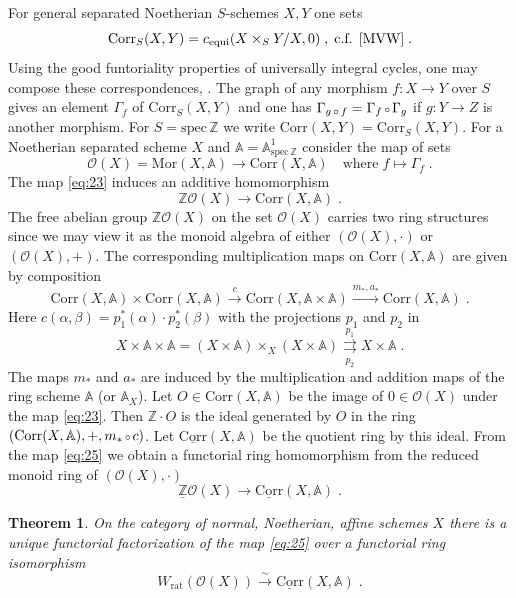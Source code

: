 \documentclass[12pt,leqno]{article}
\newcommand{\A}{{\mathbb{A}}}
\newcommand{\Z}{{\mathbb{Z}}}
\newcommand{\uZ}{\underline{\Z}}
\newcommand{\Corr}{\mathrm{Corr}}
\newcommand{\uCorr}{\underline{\Corr}}
\newcommand{\equi}{\mathrm{equi}}
\newcommand{\Mor}{\mathrm{Mor}}
\newcommand{\spec}{\mathrm{spec}\,}
\newcommand{\rat}{\mathrm{rat}}
\newcommand{\Oh}{{\mathcal O}}
\newcommand{\silo}{\stackrel{\sim}{\rightarrow}}
\newtheorem{theorem}{Theorem}[section]
\newcommand{\verk}{\mbox{\scriptsize $\,\circ\,$}}
\begin{document}
For general separated Noetherian $S$-schemes $X , Y$ one sets
\[
\Corr_S (X,Y) = c_{\equi} (X \times_S Y / X ,0) \; , \; \text{c.f. \cite[Definition 1A.9]{MVW}} \; .
\]
Using the good funtoriality properties of universally integral cycles, one may compose these correspondences, \cite[Defintion 1A.11]{MVW}. The graph of any morphism $f : X \to Y$ over $S$ gives an element $\Gamma_f$ of $\Corr_S (X,Y)$ and one has $\Gamma_{g \verk f} = \Gamma_f \verk \Gamma_g$ if $g : Y \to Z$ is another morphism. For $S = \spec \Z$ we write $\Corr (X,Y) = \Corr_S (X,Y)$. For a Noetherian separated scheme $X$ and $\A = \A^1_{\spec \Z}$ consider the map of sets
\begin{equation}
\label{eq:23}
\Oh (X) = \Mor (X , \A) \longrightarrow \Corr (X , \A) \quad \text{where} \; f \mapsto \Gamma_f \; .
\end{equation}
The map \eqref{eq:23} induces an additive homomorphism 
\begin{equation}
\label{eq:24}
\Z \Oh (X) \longrightarrow \Corr (X, \A) \; .
\end{equation}
The free abelian group $\Z \Oh (X)$ on the set $\Oh (X)$ carries two ring structures since we may view it as the monoid algebra of either $(\Oh(X) , \cdot)$ or $(\Oh (X) , +)$. The corresponding multiplication maps on $\Corr (X, \A)$ are given by composition 
\[
\Corr (X, \A) \times \Corr (X, \A) \xrightarrow{c} \Corr (X , \A \times \A) \xrightarrow{m_* , a_*} \Corr (X , \A) \; .
\]
Here $c ( \alpha , \beta) = p^*_1 (\alpha) \cdot p^*_2 (\beta)$ with the projections $p_1$ and $p_2$ in 
\[
X \times \A \times \A = (X \times \A) \times_X (X \times \A) \overset{p_1}{\underset{p_2}\rightrightarrows} X \times \A \; .
\]
The maps $m_*$ and $a_*$ are induced by the multiplication and addition maps of the ring scheme $\A$ (or $\A_X$). Let $O \in \Corr (X , \A)$ be the image of $0 \in \Oh (X)$ under the map \eqref{eq:23}. Then $\Z \cdot O$ is the ideal generated by $O$ in the ring $(\Corr (X , \A) , + , m_* \verk c)$. Let $\uCorr (X, \A)$ be the quotient ring by this ideal. From the map \eqref{eq:25} we obtain a functorial ring homomorphism from the reduced monoid ring of $(\Oh (X) , \cdot)$
\begin{equation}
\label{eq:25}
\uZ \Oh (X) \longrightarrow \uCorr (X , \A) \; .
\end{equation}

\begin{theorem}
\label{t5.1}
On the category of normal, Noetherian, affine schemes $X$ there is a unique functorial factorization of the map \eqref{eq:25} over a functorial ring isomorphism
\begin{equation}
\label{eq:26}
W_{\rat} (\Oh (X)) \silo \uCorr (X , \A) \; .
\end{equation}
\end{theorem}
\end{document}
